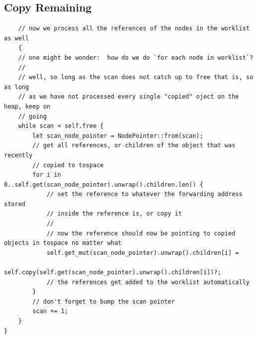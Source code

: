 \documentclass[index]{subfiles}
\begin{document}
\subsection{Copy Remaining}
\begin{verbatim}
    // now we process all the references of the nodes in the worklist as well
    {
    // one might be wonder:  how do we do `for each node in worklist`?
    // 
    // well, so long as the scan does not catch up to free that is, so as long
    // as we have not processed every single "copied" oject on the heap, keep on
    // going
    while scan < self.free {
        let scan_node_pointer = NodePointer::from(scan);
        // get all references, or children of the object that was recently
        // copied to tospace
        for i in 0..self.get(scan_node_pointer).unwrap().children.len() {
            // set the reference to whatever the forwarding address stored
            // inside the reference is, or copy it
            // 
            // now the reference should now be pointing to copied objects in tospace no matter what
            self.get_mut(scan_node_pointer).unwrap().children[i] =
                self.copy(self.get(scan_node_pointer).unwrap().children[i])?;
            // the references get added to the worklist automatically
        }
        // don't forget to bump the scan pointer
        scan += 1;
    }
}
\end{verbatim}
\end{document}
